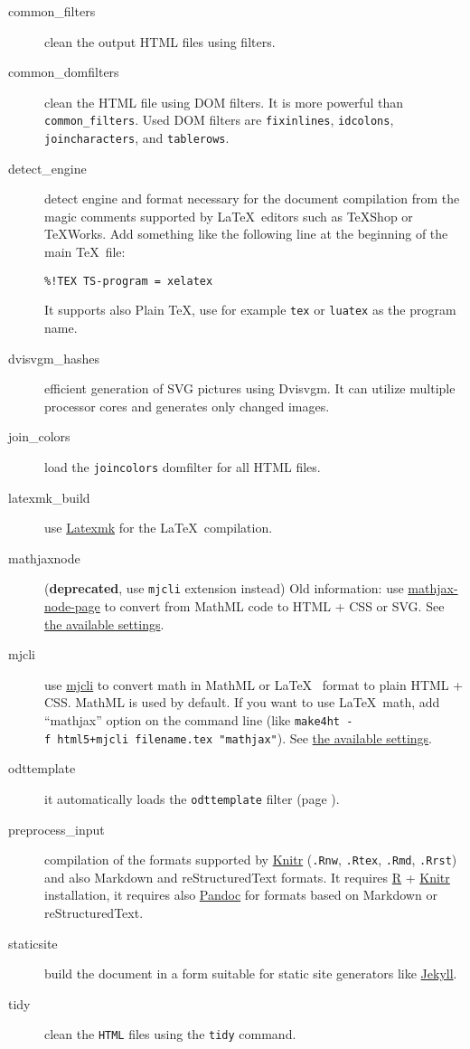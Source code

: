 \begin{description}
\item[common\_filters]
clean the output HTML files using filters.
\item[common\_domfilters]
clean the HTML file using DOM filters. It is more powerful than
\texttt{common\_filters}. Used DOM filters are \texttt{fixinlines},
\texttt{idcolons}, \texttt{joincharacters}, and \texttt{tablerows}.
\item[detect\_engine]
detect engine and format necessary for the document compilation from the
magic comments supported by \LaTeX~editors such as TeXShop or TeXWorks.
Add something like the following line at the beginning of the main
\TeX~file:

\texttt{\%!TEX\ TS-program\ =\ xelatex}

It supports also Plain \TeX, use for example \texttt{tex} or
\texttt{luatex} as the program name.
\item[dvisvgm\_hashes]
efficient generation of SVG pictures using Dvisvgm. It can utilize
multiple processor cores and generates only changed images.
\item[join\_colors]
load the \texttt{joincolors} domfilter for all HTML files.
\item[latexmk\_build]
use \href{https://ctan.org/pkg/latexmk?lang=en}{Latexmk} for the
\LaTeX~compilation.
\item[mathjaxnode]
(\textbf{deprecated}, use \texttt{mjcli} extension instead) Old
information: use
\href{https://github.com/pkra/mathjax-node-page/}{mathjax-node-page} to
convert from MathML code to HTML + CSS or SVG. See
\protect\hyperlink{mathjaxsettings}{the available settings}.
\item[mjcli]
use \href{https://github.com/michal-h21/mjcli}{mjcli} to convert math in
MathML or \LaTeX~ format to plain HTML + CSS. MathML is used by default.
If you want to use \LaTeX~math, add ``mathjax'' option on the command
line (like \texttt{make4ht\ -f\ html5+mjcli\ filename.tex\ "mathjax"}).
See \protect\hyperlink{mathjaxsettings}{the available settings}.
\item[odttemplate]
it automatically loads the \texttt{odttemplate} filter (page
\pageref{sec:odttemplate}).
\item[preprocess\_input]
compilation of the formats supported by
\href{https://yihui.name/knitr/}{Knitr} (\texttt{.Rnw}, \texttt{.Rtex},
\texttt{.Rmd}, \texttt{.Rrst}) and also Markdown and reStructuredText
formats. It requires \href{https://www.r-project.org/}{R} +
\href{https://yihui.name/knitr/}{Knitr} installation, it requires also
\href{https://pandoc.org/}{Pandoc} for formats based on Markdown or
reStructuredText.
\item[staticsite]
build the document in a form suitable for static site generators like
\href{https://jekyllrb.com/}{Jekyll}.
\item[tidy]
clean the \texttt{HTML} files using the \texttt{tidy} command.
\end{description}

